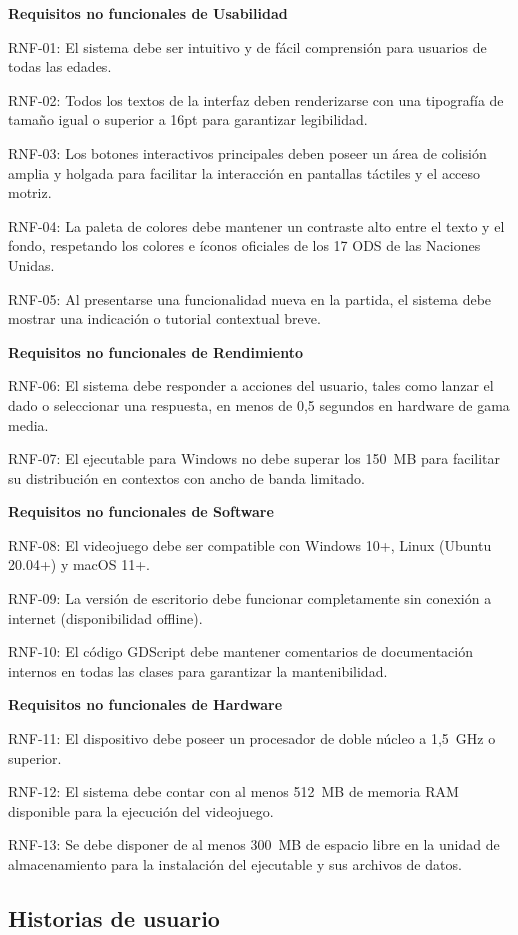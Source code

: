 \textbf{Requisitos no funcionales de Usabilidad}

RNF-01: El sistema debe ser intuitivo y de fácil comprensión para usuarios de todas las edades.

RNF-02: Todos los textos de la interfaz deben renderizarse con una tipografía de tamaño igual o superior a 16pt para garantizar legibilidad.

RNF-03: Los botones interactivos principales deben poseer un área de colisión amplia y holgada para facilitar la interacción en pantallas táctiles y el acceso motriz.

RNF-04: La paleta de colores debe mantener un contraste alto entre el texto y el fondo, respetando los colores e íconos oficiales de los 17 ODS de las Naciones Unidas.

RNF-05: Al presentarse una funcionalidad nueva en la partida, el sistema debe mostrar una indicación o tutorial contextual breve.

\textbf{Requisitos no funcionales de Rendimiento}

RNF-06: El sistema debe responder a acciones del usuario, tales como lanzar el dado o seleccionar una respuesta, en menos de 0{,}5 segundos en hardware de gama media.

RNF-07: El ejecutable para Windows no debe superar los 150~MB para facilitar su distribución en contextos con ancho de banda limitado.

\textbf{Requisitos no funcionales de Software}

RNF-08: El videojuego debe ser compatible con Windows 10+, Linux (Ubuntu 20.04+) y macOS 11+.

RNF-09: La versión de escritorio debe funcionar completamente sin conexión a internet (disponibilidad offline).

RNF-10: El código GDScript debe mantener comentarios de documentación internos en todas las clases para garantizar la mantenibilidad.

\textbf{Requisitos no funcionales de Hardware}

RNF-11: El dispositivo debe poseer un procesador de doble núcleo a 1{,}5~GHz o superior.

RNF-12: El sistema debe contar con al menos 512~MB de memoria RAM disponible para la ejecución del videojuego.

RNF-13: Se debe disponer de al menos 300~MB de espacio libre en la unidad de almacenamiento para la instalación del ejecutable y sus archivos de datos.

\subsection{Historias de usuario}
\label{subsec:historias_usuario}

